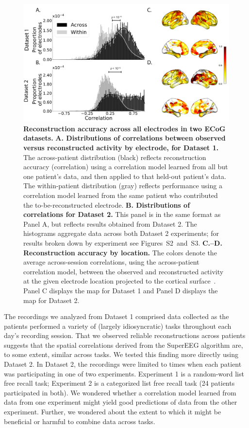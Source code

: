 \documentclass[11pt]{article}
\newcommand{\splitexpviolins}{S2}
\newcommand{\splitexpcorrmaps}{S3}
\begin{document}
\begin{figure}
  \centering \includegraphics[width=\textwidth]{figs/corrmap}
  \caption{\textbf{Reconstruction accuracy across all electrodes in two ECoG
  datasets.}  \textbf{A. Distributions of correlations between observed versus
  reconstructed activity by electrode, for Dataset 1.}  The across-patient
  distribution (black) reflects reconstruction accuracy (correlation) using a
  correlation model learned from all but one patient's data, and then applied to
  that held-out patient's data.  The within-patient distribution (gray) reflects
  performance using a correlation model learned from the same patient who
  contributed the to-be-reconstructed electrode. \textbf{B. Distributions of
  correlations for Dataset 2.}  This panel is in the same format as Panel A, but
  reflects results obtained from Dataset 2.  The histograms aggregate data
  across both Dataset 2 experiments; for results broken down by experiment see
  Figures~\splitexpviolins~and~\splitexpcorrmaps. \textbf{C.--D.  Reconstruction accuracy by
  location.} The colors denote the average across-session correlations, using
  the across-patient correlation model, between the observed and reconstructed
  activity at the given electrode location projected to the cortical
  surface~\citep{CombEtal19}.  Panel C displays the map for Dataset 1 and Panel
  D displays the map for Dataset 2.} \label{fig:corrmap}
\end{figure}

The recordings we analyzed from Dataset 1 comprised data collected as the
patients performed a variety of (largely idiosyncratic) tasks throughout each
day's recording session.  That we observed reliable reconstructions  across
patients suggests that the spatial correlations derived from the SuperEEG
algorithm are, to some extent, similar across tasks.  We tested this finding
more directly using Dataset 2.  In Dataset 2, the recordings were limited to
times when each patient was participating in one of two experiments.  Experiment
1 is a random-word list free recall task; Experiment 2 is a categorized list
free recall task (24 patients participated in both).  We wondered whether a
correlation model learned from data from one experiment might yield good
predictions of data from the other experiment.  Further, we wondered about the
extent to which it might be beneficial or harmful to combine data across tasks.
\end{document}
